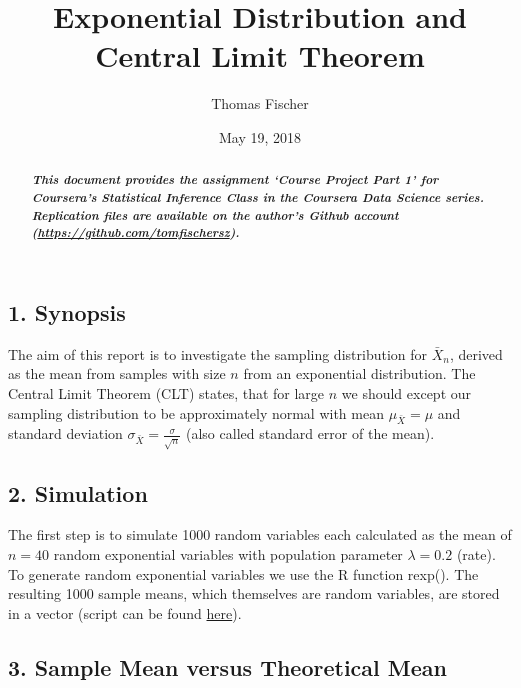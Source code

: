 \documentclass[]{article}
\title{Exponential Distribution and Central Limit Theorem}
\author{Thomas Fischer}
\date{May 19, 2018}
\newenvironment{Shaded}{\begin{snugshade}}{\end{snugshade}}
\newcommand{\KeywordTok}[1]{\textcolor[rgb]{0.13,0.29,0.53}{\textbf{#1}}}
\newcommand{\DataTypeTok}[1]{\textcolor[rgb]{0.13,0.29,0.53}{#1}}
\newcommand{\StringTok}[1]{\textcolor[rgb]{0.31,0.60,0.02}{#1}}
\newcommand{\OtherTok}[1]{\textcolor[rgb]{0.56,0.35,0.01}{#1}}
\newcommand{\OperatorTok}[1]{\textcolor[rgb]{0.81,0.36,0.00}{\textbf{#1}}}
\newcommand{\NormalTok}[1]{#1}
\begin{document}
\maketitle
\begin{abstract}
\textbf{\emph{This document provides the assignment `Course Project Part
1' for Coursera's Statistical Inference Class in the Coursera Data
Science series. Replication files are available on the author's Github
account (\url{https://github.com/tomfischersz}).}}
\end{abstract}

\begin{Shaded}
\end{Shaded}

\subsection{1. Synopsis}\label{synopsis}

The aim of this report is to investigate the sampling distribution for
\(\bar X_n\), derived as the mean from samples with size \(n\) from an
exponential distribution. The Central Limit Theorem (CLT) states, that
for large \(n\) we should except our sampling distribution to be
approximately normal with mean \(\mu_{\bar X} =\mu\) and standard
deviation \(\sigma_{\bar X} =\)\(\frac{\sigma}{\sqrt{n}}\) (also called
standard error of the mean).

\subsection{2. Simulation}\label{simulation}

The first step is to simulate 1000 random variables each calculated as
the mean of \(n = 40\) random exponential variables with population
parameter \(\lambda = 0.2\) (rate). To generate random exponential
variables we use the R function rexp(). The resulting 1000 sample means,
which themselves are random variables, are stored in a vector (script
can be found \protect\hyperlink{Appendix_1}{here}).

\subsection{3. Sample Mean versus Theoretical
Mean}\label{sample-mean-versus-theoretical-mean}
\end{document}
